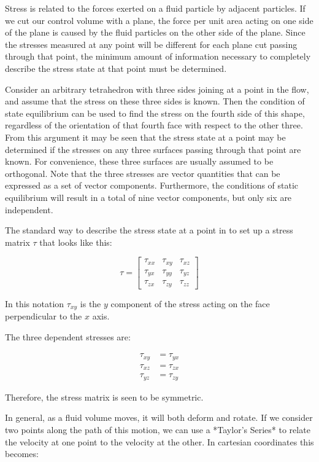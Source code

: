 Stress is related to the forces exerted on a fluid particle by adjacent
particles. If we cut our control volume with a plane, the force per unit area
acting on one side of the plane is caused by the fluid particles on the other
side of the plane. Since  the stresses measured at any point will be different
for each plane cut passing through that point, the minimum amount of
information necessary to completely describe the stress state at that point
must be determined.

Consider an arbitrary tetrahedron with three sides joining at a point in the
flow, and assume that the stress on these three sides is known. Then the
condition of state equilibrium can be used to find the stress on the fourth
side of this shape, regardless of the orientation of that fourth face with
respect to the other three. From this argument it may be seen that the stress
state at a point may be determined if the stresses on any three surfaces
passing through that point are known. For convenience, these three surfaces are
usually assumed to be orthogonal. Note that the three stresses are vector
quantities that can be expressed as a set of vector components. Furthermore,
the conditions of static equilibrium will result in a total of nine vector
components, but only six are independent.

The standard way to describe the stress state at a point in to set up a stress
matrix $\tau$ that looks like this:

\begin{equation}
\tau = \begin{bmatrix}
\tau_{xx} & \tau_{xy} & \tau_{xz}\\
\tau_{yx} & \tau_{yy} & \tau_{yz} \\
\tau_{zx} & \tau_{zy} & \tau_{zz}
\end{bmatrix}
\end{equation}

In this notation $\tau_{xy}$ is the $y$ component of the stress acting on the
face perpendicular to the $x$ axis.

The three dependent stresses are:

\begin{align*}
\tau_{xy} &= \tau_{yx} \\
\tau_{xz} &= \tau_{zx} \\
\tau_{yz} &= \tau_{zy}
\end{align*}

Therefore, the stress matrix is seen to be symmetric.

In general, as a fluid volume moves, it will both deform and rotate. If we consider two points along the path of this motion, we can use a *Taylor's Series* to relate the velocity at one point to the velocity at the other. In cartesian coordinates this becomes:


